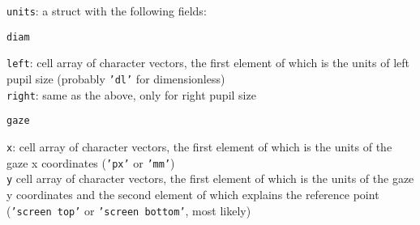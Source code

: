 \documentclass{article}
\begin{document}
\begin{addmargin}[1em]{0em}
\begin{addmargin}[1em]{0em}
\end{addmargin}
\texttt{units}: a struct with the following fields:
\begin{addmargin}[1em]{0em}
\texttt{diam}
\begin{addmargin}[1em]{0em}
\texttt{left}: cell array of character vectors, the first element of which is the units of left pupil size (probably \texttt{'dl'} for dimensionless)\\
\texttt{right}: same as the above, only for right pupil size
\end{addmargin}
\texttt{gaze}
\begin{addmargin}[1em]{0em}
\texttt{x}: cell array of character vectors, the first element of which is the units of the gaze x coordinates (\texttt{'px'} or \texttt{'mm'})\\
\texttt{y} cell array of character vectors, the first element of which is the units of the gaze y coordinates and the second element of which explains the reference point (\texttt{'screen top'} or \texttt{'screen bottom'}, most likely)
\end{addmargin}
\end{addmargin}
\end{addmargin}
\end{document}
